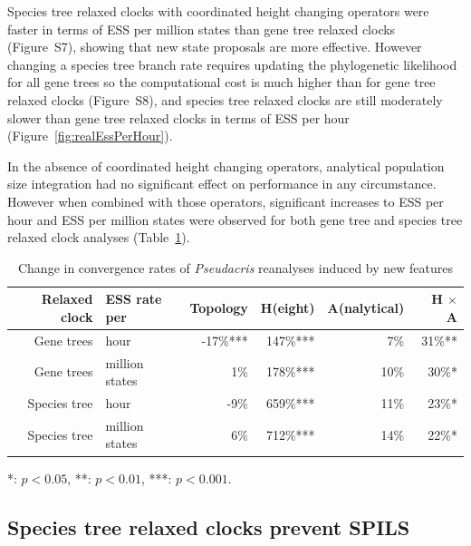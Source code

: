 \documentclass[12pt]{article}
\begin{document}
Species tree relaxed clocks with coordinated height changing operators were
faster in terms of ESS per million states than gene tree relaxed clocks
(Figure~S7), showing that new state proposals are more effective. However
changing a species tree branch rate requires updating the phylogenetic
likelihood for all gene trees so the computational cost is much higher than for
gene tree relaxed clocks (Figure~S8), and species tree relaxed clocks are still
moderately slower than gene tree relaxed clocks in terms of ESS per hour
(Figure~\ref{fig:realEssPerHour}).

In the absence of coordinated height changing operators, analytical population
size integration had no significant effect on performance in any
circumstance. However when combined with those operators, significant increases
to ESS per hour and ESS per million states were observed for both gene tree and
species tree relaxed clock analyses (Table~\ref{tab:convergenceLM}).

\begin{table}[htb!]
\caption{Change in convergence rates of \textit{Pseudacris} reanalyses induced by new features}
\label{tab:convergenceLM}
\begin{threeparttable}
\begin{tabular*}{\textwidth}{@{\extracolsep{\fill}}rlrrrr@{}}
\hline
Relaxed clock & ESS rate per & Topology & H(eight) & A(nalytical) & H $\times$ A\tabularnewline
\hline
Gene trees & hour & -17\%{***} & 147\%{***} & 7\%\hphantom{***} & 31\%{**}\hphantom{*}\tabularnewline
Gene trees & million states & 1\%\hphantom{***} & 178\%{***} & 10\%\hphantom{***} & 30\%{*}\hphantom{**}\tabularnewline
Species tree & hour & -9\%\hphantom{***} & 659\%{***} & 11\%\hphantom{***} & 23\%{*}\hphantom{**}\tabularnewline
Species tree & million states & 6\%\hphantom{***} & 712\%{***} & 14\%\hphantom{***} & 22\%{*}\hphantom{**}\tabularnewline
\hline
\end{tabular*}
\begin{tablenotes}
\item {*}: $p < 0.05$, {**}: $p < 0.01$, {***}: $p < 0.001$.
\end{tablenotes}
\end{threeparttable}
\end{table}

\subsection{Species tree relaxed clocks prevent SPILS}
\end{document}
